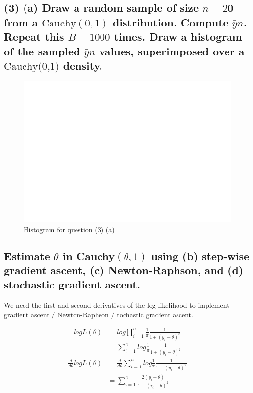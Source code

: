 \documentclass[11pt]{article}
\begin{document}
\subsection*{(3)  (a) Draw a random sample of size $n = 2$0 from a $\text{Cauchy}(0,1)$ distribution. Compute $\bar{y}n$. Repeat this $B = 1000$ times. Draw a histogram of the sampled $\bar{y}n$ values, superimposed over a $\text{Cauchy(0,1)}$ density.}

\begin{figure}[!h]
    \centering
    \includegraphics[scale=.55]{homework_2/figures/cauchy_mean.png}
    \caption{Histogram for question (3) (a)}
    \label{fig:my_label}
\end{figure}

\subsection*{Estimate $\theta$ in Cauchy$(\theta, 1)$ using (b) step-wise gradient ascent, (c) Newton-Raphson, and (d) stochastic gradient ascent. }

We need the first and second derivatives of the log likelihood to implement gradient ascent / Newton-Raphson / tochastic gradient ascent. 

\begin{align*} log L(\theta) &= log \prod_{i=1}^n \frac{1}{\pi}\frac{1}{1+(y_i-\theta)^2} \\
&= \sum_{i=1}^n log \frac{1}{\pi}\frac{1}{1+(y_i-\theta)^2} \end{align*}
\begin{align*} \frac{d}{d\theta}log L(\theta) &= \frac{d}{d\theta}\sum_{i=1}^n log \frac{1}{\pi}\frac{1}{1+(y_i-\theta)^2} \\
&=  \sum_{i=1}^n   \frac{2(y_i-\theta)}{1+(y_i-\theta)^2}\end{align*}
\end{document}
